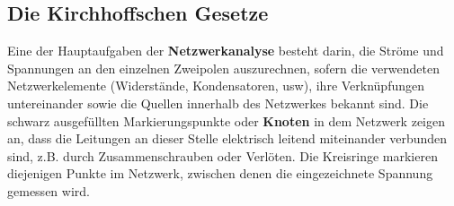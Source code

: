 \subsection{Die Kirchhoffschen Gesetze}
Eine der Hauptaufgaben der \textbf{Netzwerkanalyse} besteht darin, die Ströme und Spannungen an den einzelnen Zweipolen auszurechnen, sofern die verwendeten Netzwerkelemente (Widerstände, Kondensatoren, usw), ihre Verknüpfungen untereinander sowie die Quellen innerhalb des Netzwerkes bekannt sind.
\newline\newline
Die schwarz ausgefüllten Markierungspunkte oder \textbf{Knoten} in dem Netzwerk zeigen an, dass die Leitungen an dieser Stelle elektrisch leitend miteinander verbunden sind, z.B. durch Zusammenschrauben oder Verlöten. Die Kreisringe markieren diejenigen Punkte im Netzwerk, zwischen denen die eingezeichnete Spannung gemessen wird.
